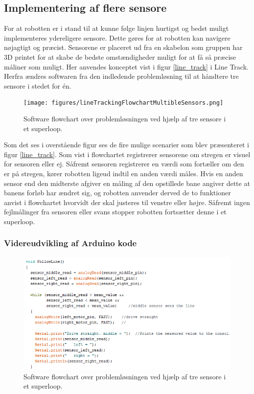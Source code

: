 \subsection*{Implementering af flere sensore}
For at robotten er i stand til at kunne følge linjen hurtigst og bedst muligt implementeres ydereligere sensore. Dette gøres for at robotten kan navigere nøjagtigt og præcist. Sensorene er placeret ud fra en skabelon som gruppen har 3D printet for at skabe de bedste omstændigheder muligt for at få så præcise måliner som muligt.
\newline 
Her anvendes konceptet vist i figur \ref{line_track} i Line Track. Herfra ændres softwaren fra den indledende problemløsning til at håndtere tre sensore i stedet for én. 

\begin{figure}[h!]
  \centering
  \texttt{[image: figures/lineTrackingFlowchartMultibleSensors.png]}
  \caption{Software flowchart over problemløsningen ved hjælp af tre sensore i et superloop.}
  \label{flowchart_flere_sensorer}
\end{figure}

Som det ses i overstående figur ses de fire mulige scenarier som blev præsenteret i figur \ref{line_track}.
Som vist i flowchartet registrerer sensorene om stregen er visuel for sensoren eller ej. Såfremt sensoren registrerer en værdi som fortæller om den er på stregen, kører robotten ligeud indtil en anden værdi måles. 
\newline 
Hvis en anden sensor end den midterste afgiver en måling af den opstillede bane angiver dette at banens forløb har ændret sig, og robotten anvender derved de to funktioner anvist i flowchartet hvorvidt der skal justeres til venstre eller højre. 
\newline
Såfremt ingen fejlmålinger fra sensoren eller svans stopper robotten fortsætter denne i et superloop.

\subsubsection{Videreudvikling af Arduino kode}
\begin{figure}[h!]
  \centering
  \includegraphics[width=1.0\textwidth]{figures/treSensoreFollowLine.png}
  \caption{Software flowchart over problemløsningen ved hjælp af tre sensore i et superloop.}
  \label{tre_sensore_followline}
\end{figure}


 


